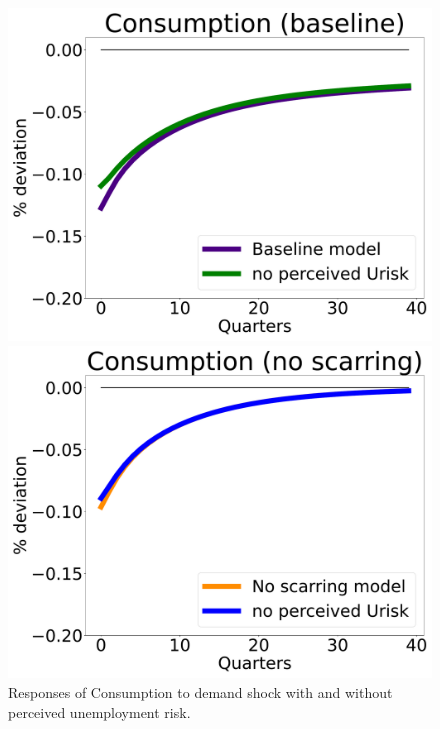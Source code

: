 \begin{figure}[H]
    \centering
   \begin{minipage}{0.47\textwidth}
        \centering
        \includegraphics[scale=.2]{text/Chapter1/Figures/Urisk/C_IPR_urisk_base_flex_wage} %
    \end{minipage}\hfill
    \begin{minipage}{0.47\textwidth}
        \centering
        \includegraphics[scale=.2]{text/Chapter1/Figures/Urisk/C_IPR_urisk_base_no_scar_flex_wage} %
    \end{minipage}
    \caption{Responses of Consumption to demand shock with and without perceived unemployment risk.}
    \label{Urisk_base}
\end{figure}




